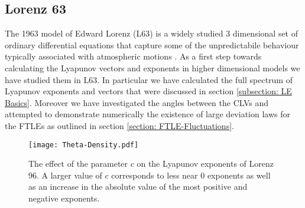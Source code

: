 \subsection{Lorenz 63} \label{subsection: L63 Results}

The 1963 model of Edward Lorenz (L63) is a widely studied $3$ dimensional set of ordinary differential equations that capture some of the unpredictabile behaviour typically associated with atmospheric motions \cite{Lorenz1963} \cite{Sparrow1982}. As a first step towards calculating the Lyapunov vectors and exponents in higher dimensional models we have studied them in L63. In particular we have calculated the full spectrum of Lyapunov exponents and vectors that were discussed in section \ref{subsection: LE Basics}. Moreover we have investigated the angles between the CLVs and attempted to demonstrate numerically the existence of large deviation laws for the FTLEs as outlined in section \ref{section: FTLE-Fluctuations}.\\

\begin{figure}
\centering
\texttt{[image: Theta-Density.pdf]}
\caption{The effect of the parameter $c$ on the Lyapunov exponents of Lorenz $96$. A larger value of $c$ corresponds to less near $0$ exponents as well as an increase in the absolute value of the most positive and negative exponents.}
\label{fig:c-effect-CLE}
\end{figure}

